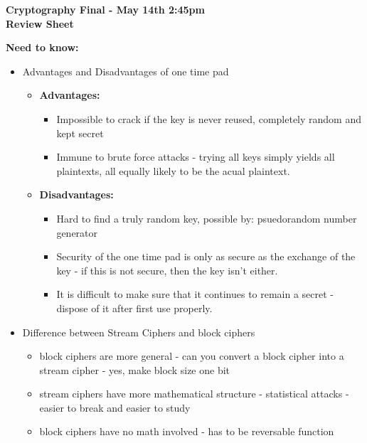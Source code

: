 \documentclass[12pt]{amsart}
\begin{document}
\thispagestyle{empty}

\begin{center}
{\bf Cryptography Final - May 14th 2:45pm}\\
{\bf Review Sheet}\\
\end{center}

{\bf Need to know:}\\

\begin{itemize}
\item{} Advantages and Disadvantages of one time pad\\
	\begin{itemize}
	\item{} {\bf Advantages:}
		\begin{itemize}
		\item{} Impossible to crack if the key is never reused, completely random and kept secret	
		\item{} Immune to brute force attacks - trying all keys simply yields all plaintexts, all equally likely to be the acual plaintext.
		\end{itemize}
	\item{} {\bf Disadvantages:}
		\begin{itemize}
		\item{} Hard to find a truly random key, possible by: psuedorandom number generator
		\item{} Security of the one time pad is only as secure as the exchange of the key - if this is not secure, then the key isn't either.
		\item{} It is difficult to make sure that it continues to remain a secret - dispose of it after first use properly.
		\end{itemize}
	\end{itemize}
\item{} Difference between Stream Ciphers and block ciphers\\
\begin{itemize}
	\item{}block ciphers are more general - can you convert a block cipher into a stream cipher - yes, make block size one bit\\
	\item{}stream ciphers have more mathematical structure - statistical attacks - easier to break and easier to study\\
	\item{}block ciphers have no math involved - has to be reversable function\\

\end{itemize}
\end{itemize}
\end{document}
